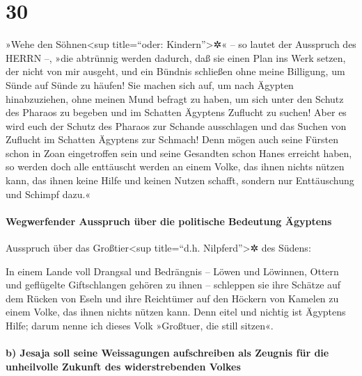 \hypertarget{section-29}{%
\section{30}\label{section-29}}

»Wehe den Söhnen\textless sup title=``oder:
Kindern''\textgreater✲« -- so lautet der Ausspruch des HERRN --, »die
abtrünnig werden dadurch, daß sie einen Plan ins Werk setzen, der nicht
von mir ausgeht, und ein Bündnis schließen ohne meine Billigung, um
Sünde auf Sünde zu häufen! Sie machen sich auf, um nach
Ägypten hinabzuziehen, ohne meinen Mund befragt zu haben, um sich unter
den Schutz des Pharaos zu begeben und im Schatten Ägyptens Zuflucht zu
suchen! Aber es wird euch der Schutz des Pharaos zur
Schande ausschlagen und das Suchen von Zuflucht im Schatten Ägyptens zur
Schmach! Denn mögen auch seine Fürsten schon in Zoan
eingetroffen sein und seine Gesandten schon Hanes erreicht haben,
so werden doch alle enttäuscht werden an einem Volke, das
ihnen nichts nützen kann, das ihnen keine Hilfe und keinen Nutzen
schafft, sondern nur Enttäuschung und Schimpf dazu.«

\hypertarget{wegwerfender-ausspruch-uxfcber-die-politische-bedeutung-uxe4gyptens}{%
\paragraph{Wegwerfender Ausspruch über die politische Bedeutung
Ägyptens}\label{wegwerfender-ausspruch-uxfcber-die-politische-bedeutung-uxe4gyptens}}

Ausspruch über das Großtier\textless sup title=``d.h.
Nilpferd''\textgreater✲ des Südens:

In einem Lande voll Drangsal und Bedrängnis -- Löwen und Löwinnen,
Ottern und geflügelte Giftschlangen gehören zu ihnen -- schleppen sie
ihre Schätze auf dem Rücken von Eseln und ihre Reichtümer auf den
Höckern von Kamelen zu einem Volke, das ihnen nichts nützen kann.
Denn eitel und nichtig ist Ägyptens Hilfe; darum nenne ich
dieses Volk »Großtuer, die still sitzen«.

\hypertarget{b-jesaja-soll-seine-weissagungen-aufschreiben-als-zeugnis-fuxfcr-die-unheilvolle-zukunft-des-widerstrebenden-volkes}{%
\paragraph{b) Jesaja soll seine Weissagungen aufschreiben als Zeugnis
für die unheilvolle Zukunft des widerstrebenden
Volkes}\label{b-jesaja-soll-seine-weissagungen-aufschreiben-als-zeugnis-fuxfcr-die-unheilvolle-zukunft-des-widerstrebenden-volkes}}

